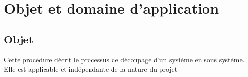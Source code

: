 \section{Objet et domaine d'application}
\subsection{Objet}
Cette procédure décrit le processus de découpage d'un système en sous système.
Elle est applicable et indépendante de la nature du projet
